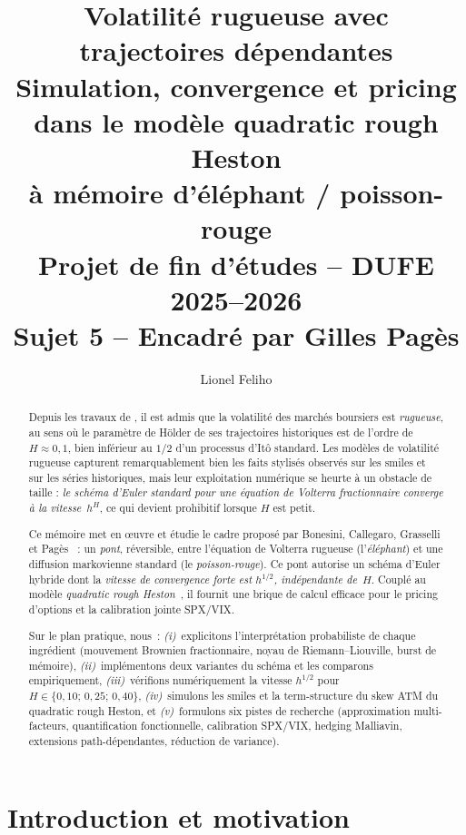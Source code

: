 \documentclass[11pt,a4paper]{article}
\title{\textbf{Volatilité rugueuse avec trajectoires dépendantes}\\
\large Simulation, convergence et pricing dans le modèle quadratic rough Heston\\
à mémoire d'éléphant / poisson-rouge\\[2mm]
\normalsize Projet de fin d'études -- DUFE 2025--2026\\
\normalsize Sujet 5 -- Encadré par Gilles Pagès}
\author{Lionel Feliho}
\date{}
\theoremstyle{definition}
\newcommand{\1}{\mathbf{1}}
\begin{document}
\maketitle

\begin{abstract}
\noindent
Depuis les travaux de \cite{GJR14}, il est admis que la volatilité des marchés
boursiers est \emph{rugueuse}, au sens où le paramètre de Hölder de ses
trajectoires historiques est de l'ordre de $H\approx 0{,}1$, bien inférieur au $1/2$
d'un processus d'Itô standard. Les modèles de volatilité rugueuse capturent
remarquablement bien les faits stylisés observés sur les smiles et sur les séries
historiques, mais leur exploitation numérique se heurte à un obstacle de taille :
\emph{le schéma d'Euler standard pour une équation de Volterra fractionnaire
converge à la vitesse~$h^H$}, ce qui devient prohibitif lorsque $H$ est petit.

\vspace{1mm}
Ce mémoire met en œuvre et étudie le cadre proposé par Bonesini, Callegaro,
Grasselli et Pagès~\cite{BCGP23} : un \emph{pont}, réversible, entre l'équation de
Volterra rugueuse (l'\textit{éléphant}) et une diffusion markovienne standard
(le \textit{poisson-rouge}). Ce pont autorise un schéma d'Euler hybride dont la
\emph{vitesse de convergence forte est $h^{1/2}$, indépendante de~$H$}. Couplé
au modèle \emph{quadratic rough Heston}~\cite{GJR20}, il fournit une brique de
calcul efficace pour le pricing d'options et la calibration jointe SPX/VIX.

\vspace{1mm}
Sur le plan pratique, nous~: \emph{(i)}~explicitons l'interprétation probabiliste
de chaque ingrédient (mouvement Brownien fractionnaire, noyau de Riemann--Liouville,
burst de mémoire), \emph{(ii)}~implémentons deux variantes du schéma et les
comparons empiriquement, \emph{(iii)}~vérifions numériquement la vitesse $h^{1/2}$
pour $H\in\{0{,}10;\,0{,}25;\,0{,}40\}$, \emph{(iv)}~simulons les smiles et la
term-structure du skew ATM du quadratic rough Heston, et \emph{(v)}~formulons
six pistes de recherche (approximation multi-facteurs, quantification
fonctionnelle, calibration SPX/VIX, hedging Malliavin, extensions
path-dépendantes, réduction de variance).
\end{abstract}

\tableofcontents
\bigskip

\section{Introduction et motivation}
\end{document}
